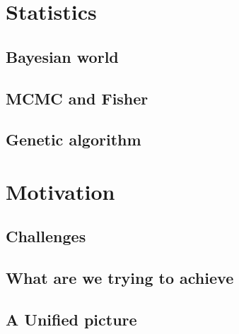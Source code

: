 \section{Statistics}
\subsection{Bayesian world}
\subsection{MCMC and Fisher}
\subsection{Genetic algorithm}

\section{Motivation}

\subsection{Challenges}
\subsection{What are we trying to achieve}
\subsection{A Unified picture}


\clearpage
\cite{2014MNRAS.440.2290M}

\cite{2014MNRAS.439.2651M}

\cite{2014A&A...567A..65B}

\cite{2014MNRAS.445.3382M}

\cite{2014arXiv1410.6826M}

\cite{2015PASJ...67...21M}

\cite{2015arXiv150403388M}



